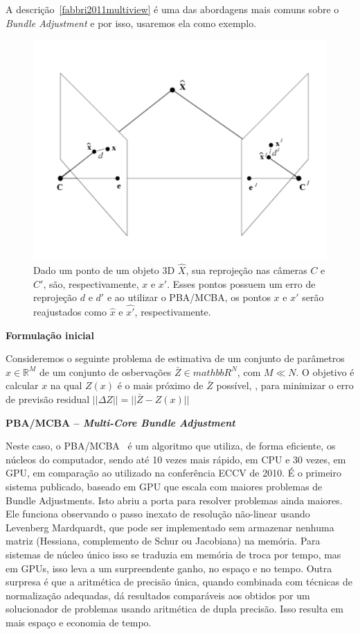 \begin{itemize}
A descrição~\ref{fabbri2011multiview} é uma das abordagens mais comuns sobre o \emph{Bundle Adjustment} e por isso, usaremos ela como exemplo. 

\begin{figure}[!h]
	\centering
	\includegraphics[width=0.5\linewidth]{figs/bundleAdjustment.png}
	\caption{
	Dado um ponto de um objeto 3D $\widehat{X}$, sua reprojeção nas câmeras $C$ e $C'$, são, respectivamente, $x$ e $x'$. Esses pontos possuem um erro de reprojeção $d$ e $d'$ e ao utilizar o PBA/MCBA, os pontos $x$ e $x'$ serão reajustados como $\widehat{x}$ e $\widehat{x'}$, respectivamente. 
	\protect\cite{3DCompVision2Didier}
	}\label{fig:bundleAdjustment}
\end{figure}

\textbf{Formulação inicial}

Consideremos o seguinte problema de estimativa de um conjunto de parâmetros $x \in \mathbb{R}^M$ de um conjunto de osbervações $\bar{Z} \in mathbb{R}^N$, com $M \ll N$. O objetivo é calcular $x$ na qual $Z(x)$ é o mais próximo de $\bar{Z}$ possível, \ie, para minimizar o erro de previsão residual $|| \Delta Z || = || \bar{Z} - Z(x) ||$

\textbf{PBA/MCBA -- \emph{Multi-Core Bundle Adjustment}}\label{pba}

Neste caso, o PBA/MCBA~\cite{furukawa2009accurate,wu2011multicore} é um algoritmo que utiliza, de forma eficiente, os núcleos do computador, sendo até 10 vezes mais rápido, em CPU e 30 vezes, em GPU, em comparação ao utilizado na conferência ECCV de 2010. É o primeiro sistema publicado, baseado em GPU que escala com maiores problemas de Bundle Adjustments. Isto abriu a porta para resolver problemas ainda maiores. Ele funciona observando o passo inexato de resolução não-linear usando Levenberg Mardquardt, que pode ser implementado sem armazenar nenhuma matriz (Hessiana, complemento de Schur ou Jacobiana) na memória. Para sistemas de núcleo único isso se traduzia em memória de troca por tempo, mas em GPUs, isso leva a um surpreendente ganho, no espaço e no tempo. Outra surpresa é que a aritmética de precisão única, quando combinada com técnicas de normalização adequadas, dá resultados comparáveis aos obtidos por um solucionador de problemas usando aritmética de dupla precisão. Isso resulta em mais espaço e economia de tempo.


\end{itemize}
